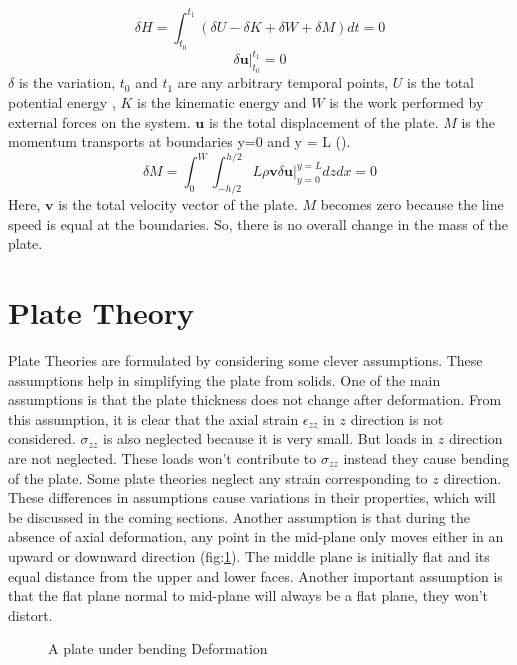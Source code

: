 \documentclass[main.tex]{subfiles}
\begin{document}
 \begin{equation}\label{eq:HAM_P}
 \delta H=\int_{t_0}^{t_1} \left( \delta U - \delta K + \delta W + \delta M \right) dt  = 0  
 \end{equation}
 \begin{equation}\label{eq:HAM_P_C}
  \delta \mathbf{u} \Big|_{t_0}^{t_1} = 0
 \end{equation}
 $\delta$ is the variation, $t_0$ and $t_1$ are any arbitrary temporal points, $U$ is the total potential energy , $K$ is the kinematic energy and $W$ is the work performed by external forces on the system. $\mathbf{u}$ is the total displacement of the plate. $M$ is the momentum transports at boundaries y=0 and y = L (\cite{SAXINGER2016190}). 
 \begin{equation}\label{eq:vr_M}
\delta M= \int_{0}^{W} \int_{-h/2}^{h/2}L \rho \mathbf{v} \delta \mathbf{u} \Big|_{y=0}^{y=L} dz dx  = 0
 \end{equation}
Here, $\mathbf{v}$ is the total velocity vector of the plate. $M$ becomes zero because the line speed is equal at the boundaries. So, there is no overall change in the mass of the plate.

\section{Plate Theory}

Plate Theories are formulated by considering some clever assumptions. These assumptions help in simplifying the plate from solids. One of the main assumptions is that the plate thickness does not change after deformation. From this assumption, it is clear that the axial strain $\epsilon_{zz}$ in $z$ direction is not considered. $\sigma_{zz}$ is also neglected because it is very small. But loads in $z$ direction are not neglected. These loads won't contribute to $\sigma_{zz}$ instead they cause bending of the plate. Some plate theories neglect any strain corresponding to $z$ direction. These differences in assumptions cause variations in their properties, which will be discussed in the coming sections. Another assumption is that during the absence of axial deformation, any point in the mid-plane only moves either in an upward or downward direction (fig:\ref{fig:plate_def}). The middle plane is initially flat and its equal distance from the upper and lower faces. Another important assumption is that the flat plane normal to mid-plane will always be a flat plane, they won't distort. 

\begin{figure}[ht!]
\centering
\caption{A plate under bending Deformation}
\label{fig:plate_def}
\end{figure}
\end{document}
